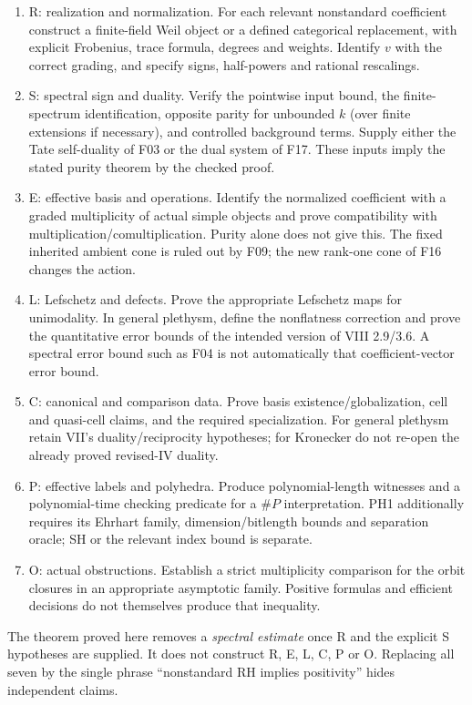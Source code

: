 \documentclass[11pt,a4paper]{article}
\newcommand{\fid}[1]{\textsf{#1}}\newcommand{\gate}[1]{\textsf{#1}}
\theoremstyle{named}\newtheorem{finding}{Finding}[section]
\theoremstyle{definition}\newtheorem{definition}[finding]{Definition}
\theoremstyle{remark}\newtheorem{remark}[finding]{Remark}
\begin{document}
\begin{enumerate}
\item \gate{R: realization and normalization.} For each relevant nonstandard coefficient construct a finite-field Weil object or a defined categorical replacement, with explicit Frobenius, trace formula, degrees and weights. Identify $v$ with the correct grading, and specify signs, half-powers and rational rescalings.
\item \gate{S: spectral sign and duality.} Verify the pointwise input bound, the finite-spectrum identification, opposite parity for unbounded $k$ (over finite extensions if necessary), and controlled background terms. Supply either the Tate self-duality of \fid{F03} or the dual system of \fid{F17}. These inputs imply the stated purity theorem by the checked proof.
\item \gate{E: effective basis and operations.} Identify the normalized coefficient with a graded multiplicity of actual simple objects and prove compatibility with multiplication/comultiplication. Purity alone does not give this. The fixed inherited ambient cone is ruled out by \fid{F09}; the new rank-one cone of \fid{F16} changes the action.
\item \gate{L: Lefschetz and defects.} Prove the appropriate Lefschetz maps for unimodality. In general plethysm, define the nonflatness correction and prove the quantitative error bounds of the intended version of VIII 2.9/3.6. A spectral error bound such as \fid{F04} is not automatically that coefficient-vector error bound.
\item \gate{C: canonical and comparison data.} Prove basis existence/globalization, cell and quasi-cell claims, and the required specialization. For general plethysm retain VII's duality/reciprocity hypotheses; for Kronecker do not re-open the already proved revised-IV duality.
\item \gate{P: effective labels and polyhedra.} Produce polynomial-length witnesses and a polynomial-time checking predicate for a \(\#P\) interpretation. PH1 additionally requires its Ehrhart family, dimension/bitlength bounds and separation oracle; SH or the relevant index bound is separate.
\item \gate{O: actual obstructions.} Establish a strict multiplicity comparison for the orbit closures in an appropriate asymptotic family. Positive formulas and efficient decisions do not themselves produce that inequality.
\end{enumerate}
The theorem proved here removes a \emph{spectral estimate} once R and the explicit S hypotheses are supplied. It does not construct R, E, L, C, P or O. Replacing all seven by the single phrase ``nonstandard RH implies positivity'' hides independent claims.
\end{document}
